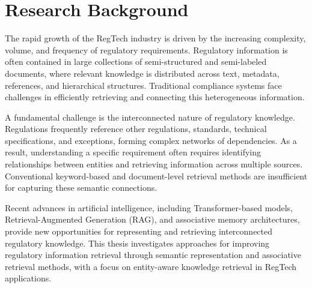 \section{Research Background}

The rapid growth of the RegTech industry is driven by the increasing complexity, volume, and frequency of regulatory requirements. Regulatory information is often contained in large collections of semi-structured and semi-labeled documents, where relevant knowledge is distributed across text, metadata, references, and hierarchical structures. Traditional compliance systems face challenges in efficiently retrieving and connecting this heterogeneous information.

A fundamental challenge is the interconnected nature of regulatory knowledge. Regulations frequently reference other regulations, standards, technical specifications, and exceptions, forming complex networks of dependencies. As a result, understanding a specific requirement often requires identifying relationships between entities and retrieving information across multiple sources. Conventional keyword-based and document-level retrieval methods are insufficient for capturing these semantic connections.

Recent advances in artificial intelligence, including Transformer-based models, Retrieval-Augmented Generation (RAG), and associative memory architectures, provide new opportunities for representing and retrieving interconnected regulatory knowledge. This thesis investigates approaches for improving regulatory information retrieval through semantic representation and associative retrieval methods, with a focus on entity-aware knowledge retrieval in RegTech applications.
